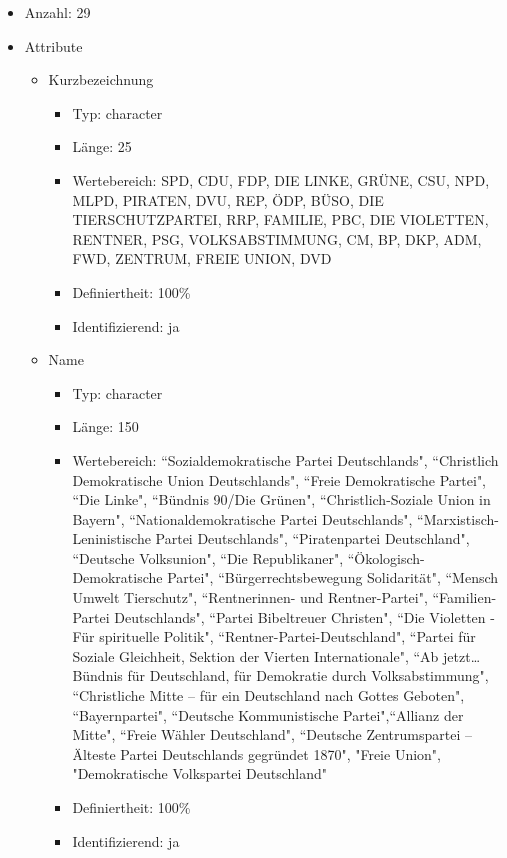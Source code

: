 \documentclass[a4paper]{article}
\begin{document}
\begin{itemize}
\item Anzahl: 29
\item Attribute
	\begin{itemize}
	\item Kurzbezeichnung
	\begin{itemize}
		\item Typ: character
		\item Länge: 25
		\item Wertebereich: SPD, CDU, FDP, DIE LINKE, GRÜNE, CSU, NPD, MLPD, PIRATEN, DVU, REP, ÖDP, BÜSO, DIE TIERSCHUTZPARTEI, RRP, FAMILIE, PBC, DIE VIOLETTEN, RENTNER, PSG, VOLKSABSTIMMUNG, CM, BP, DKP, ADM, FWD, ZENTRUM, FREIE UNION, DVD
		\item Definiertheit: 100\%
		\item Identifizierend: ja
	\end{itemize}
	\item Name
	\begin{itemize}
		\item Typ: character
		\item Länge: 150
		\item Wertebereich: ``Sozialdemokratische Partei Deutschlands", ``Christlich Demokratische Union Deutschlands", ``Freie Demokratische Partei", ``Die Linke", ``Bündnis 90/Die Grünen", ``Christlich-Soziale Union in Bayern", ``Nationaldemokratische Partei Deutschlands", ``Marxistisch-Leninistische Partei Deutschlands", ``Piratenpartei Deutschland", ``Deutsche Volksunion", ``Die Republikaner", ``Ökologisch-Demokratische Partei", ``Bürgerrechtsbewegung Solidarität", ``Mensch Umwelt Tierschutz", ``Rentnerinnen- und Rentner-Partei", ``Familien-Partei Deutschlands", ``Partei Bibeltreuer Christen", ``Die Violetten - Für spirituelle Politik", ``Rentner-Partei-Deutschland", ``Partei für Soziale Gleichheit, Sektion der Vierten Internationale", ``Ab jetzt…Bündnis für Deutschland, für Demokratie durch Volksabstimmung", ``Christliche Mitte – für ein Deutschland nach Gottes Geboten", ``Bayernpartei", ``Deutsche Kommunistische Partei",``Allianz der Mitte", ``Freie Wähler Deutschland", ``Deutsche Zentrumspartei – Älteste Partei Deutschlands gegründet 1870", "Freie Union", "Demokratische Volkspartei Deutschland"
		\item Definiertheit: 100\%
		\item Identifizierend: ja
	\end{itemize}
\end{itemize}
\end{itemize}
\end{document}
